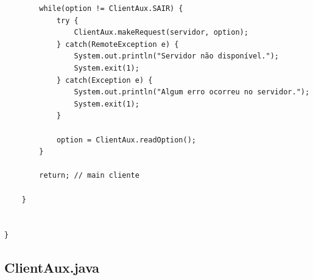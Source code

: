 \documentclass[11pt,twoside]{article}
\begin{document}
\begin{verbatim}
    	while(option != ClientAux.SAIR) {
    		try {
        		ClientAux.makeRequest(servidor, option);
    		} catch(RemoteException e) {
        		System.out.println("Servidor não disponível.");
        		System.exit(1);
    		} catch(Exception e) {
    			System.out.println("Algum erro ocorreu no servidor.");
        		System.exit(1);
    		}
    		
    		option = ClientAux.readOption();
    	}

    	return; // main cliente

    }

    	
}
\end{verbatim}


\subsection{ClientAux.java}       %
\end{document}
